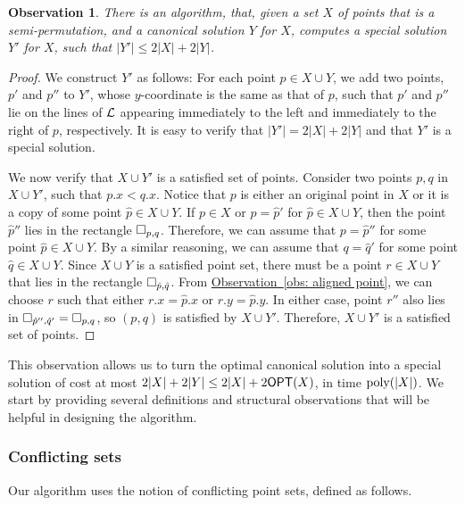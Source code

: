 \documentclass[11pt]{article}
\numberwithin{equation}{section}
\theoremstyle{definition}
\theoremstyle{plain}
\newcommand{\expref}[2]{\hyperref[#2]{#1~\ref{#2}}}
\newtheorem{myobs}[theorem]{Observation}
\begin{document}
\begin{myobs}
        \label{obs: canonical to special} 
        There is an algorithm, that, given a set $X$ of points that is a semi-permutation, and a canonical solution $Y$ for $X$, computes a special solution $Y'$ for $X$, such that $|Y'| \leq 2 |X| + 2 |Y|$. 
\end{myobs}
\begin{proof}
We construct $Y'$ as follows: For each point $p \in X \cup Y$, we add two points, $p'$ and $p''$ to $Y'$, whose $y$-coordinate is the same as that of $p$, such that $p'$ and $p''$ lie on the lines of ${\mathcal L}$ appearing immediately to the left and immediately to the right of $p$, respectively. %
                It is easy to verify that $|Y'|=2|X|+2|Y|$ and that $Y'$ is a special solution. 
        
        We now verify that $X \cup Y'$ is a satisfied set of points. 
        Consider two points $p,q$ in $X \cup Y'$, such that $p.x < q.x$. Notice that $p$ is either an original point in $X$ or it is a copy of some point $\hat p\in X \cup Y$. 
        If $p \in X$ or $p = \hat p'$ for $\hat p \in X \cup Y$, then the point $\hat p''$ lies in the rectangle $\Box_{p,q}$. Therefore, we can assume that $p=\hat p''$ for some point $\hat p\in X\cup Y$.
        By a similar reasoning, we can assume that $q=\hat q'$ for some point $\hat q\in X\cup Y$. Since $X\cup Y$ is a satisfied point set, there must be a point $r\in X\cup Y$ that lies in the rectangle $\Box_{\hat p,\hat q}$. From \expref{Observation}{obs: aligned point}, we can choose $r$ such that either $r.x=\hat p.x$ or $r.y=\hat p.y$. In either case, point $r''$ also lies in $\Box_{\hat p'',\hat q'}=\Box_{p,q}$, so $(p,q)$ is satisfied by $X\cup Y'$. %
        Therefore, $X\cup Y'$ is a satisfied set of points. 
\end{proof}



This observation allows us to turn the optimal canonical solution into a special solution of cost at most $2|X|+2|Y|\leq 2|X|+2\mbox{\sf OPT}(X)$, in time $\operatorname{poly}(|X|)$. 
We start by providing several definitions and structural observations that will be helpful in designing the algorithm.

\subsubsection{Conflicting sets} 

Our algorithm uses the notion of conflicting point sets, defined as follows.
\end{document}
